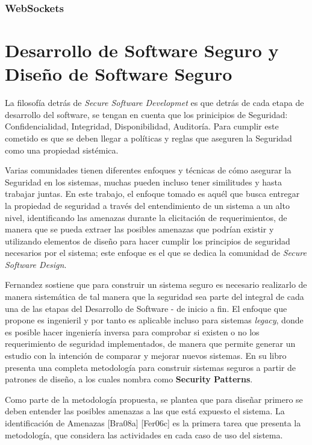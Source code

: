        \subsubsection{WebSockets}
        \label{chap2:WebSockets}


\section{Desarrollo de Software Seguro y Diseño de Software Seguro}
\label{chap2:SSD}

La filosofía detrás de \textit{Secure Software Developmet} es que detrás de cada etapa de desarrollo del software, se tengan en cuenta que los prinicipios de Seguridad: Confidencialidad, Integridad, Disponibilidad, Auditoría. Para cumplir este cometido es que se deben llegar a políticas y reglas que aseguren la Seguridad como una propiedad sistémica.

Varias comunidades tienen diferentes enfoques y técnicas de cómo asegurar la Seguridad en los sistemas, muchas pueden incluso tener similitudes y hasta trabajar juntas. En este trabajo, el enfoque tomado es aquél que busca entregar la propiedad de seguridad a través del entendimiento de un sistema a un alto nivel, identificando las amenazas durante la elicitación de requerimientos, de manera que se pueda extraer las posibles amenazas que podrían existir y utilizando elementos de diseño para hacer cumplir los principios de seguridad necesarios por el sistema; este enfoque es el que se dedica la comunidad de \textit{Secure Software Design}. 


Fernandez \cite{fernandez2013security} sostiene que para construir un sistema seguro es necesario realizarlo de manera sistemática de tal manera que la seguridad sea parte del integral de cada una de las etapas del Desarrollo de Software - de inicio a fin. El enfoque que propone es ingenieril y por tanto es aplicable incluso para sistemas \textit{legacy}, donde es posible hacer ingeniería inversa para comprobar si existen o no los requerimiento de seguridad implementados, de manera que permite generar un estudio con la intención de comparar y mejorar nuevos sistemas. En su libro \cite{fernandez2013security} presenta una completa metodología para construir sistemas seguros a partir de patrones de diseño, a los cuales nombra como \textbf{Security Patterns}.

Como parte de la metodología propuesta, se plantea que para diseñar primero se deben entender las posibles amenazas a las que está expuesto el sistema. La identificación de Amenazas [Bra08a] [Fer06c] es la primera tarea que presenta la metodología, que considera las actividades en cada caso de uso del sistema.



